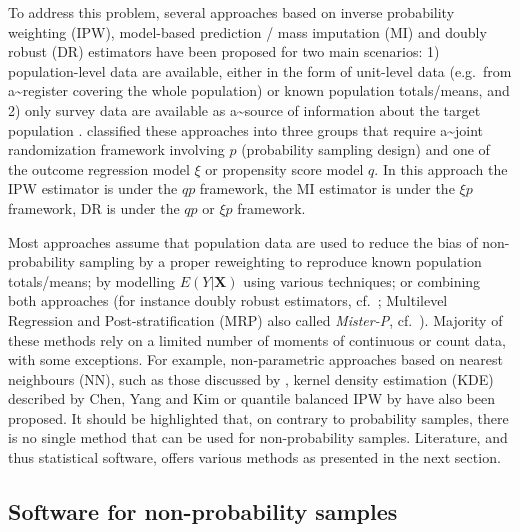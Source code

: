 \documentclass[
]{jss}
\begin{document}
To address this problem, several approaches based on inverse probability
weighting (IPW), model-based prediction / mass imputation (MI) and
doubly robust (DR) estimators have been proposed for two main scenarios:
1) population-level data are available, either in the form of unit-level
data (e.g.~from a\textasciitilde register covering the whole population)
or known population totals/means, and 2) only survey data are available
as a\textasciitilde source of information about the target population
\citep[cf.][]{elliott_inference_2017}. \citet{wu2022statistical}
classified these approaches into three groups that require
a\textasciitilde joint randomization framework involving \(p\)
(probability sampling design) and one of the outcome regression model
\(\xi\) or propensity score model \(q\). In this approach the IPW
estimator is under the \(qp\) framework, the MI estimator is under the
\(\xi p\) framework, DR is under the \(qp\) or \(\xi p\) framework.

Most approaches assume that population data are used to reduce the bias
of non-probability sampling by a proper reweighting to reproduce known
population totals/means; by modelling \(E(Y|\boldsymbol{X})\) using
various techniques; or combining both approaches (for instance doubly
robust estimators, cf.~\citet{chen2020doubly}; Multilevel Regression and
Post-stratification (MRP) also called \textit{Mister-P},
cf.~\citet{gelman1997poststratification}). Majority of these methods
rely on a limited number of moments of continuous or count data, with
some exceptions. For example, non-parametric approaches based on nearest
neighbours (NN), such as those discussed by \citet{yang2021integration},
kernel density estimation (KDE) described by Chen, Yang and Kim
\citet{chen_nonparametric_2022} or quantile balanced IPW by
\citet{beresewicz2025} have also been proposed. It should be highlighted
that, on contrary to probability samples, there is no single method that
can be used for non-probability samples. Literature, and thus
statistical software, offers various methods as presented in the next
section.

\subsection{Software for non-probability samples}\label{sec-software}
\end{document}
